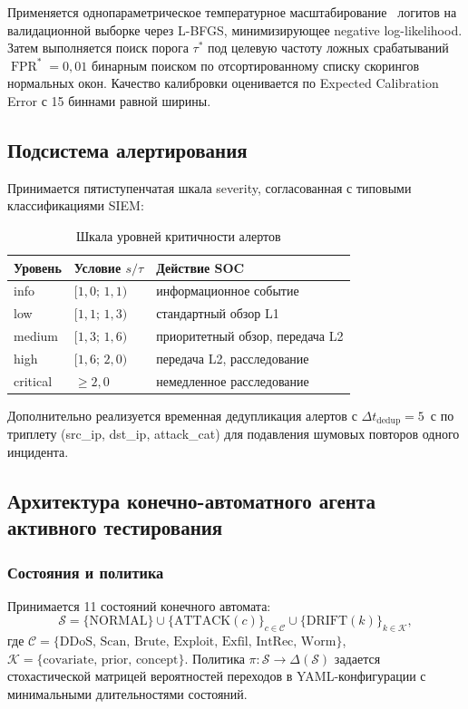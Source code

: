 Применяется однопараметрическое температурное
масштабирование~\cite{guo2017calibration} логитов на валидационной
выборке через L-BFGS, минимизирующее
negative log-likelihood. Затем выполняется поиск порога $\tau^*$
под целевую частоту ложных срабатываний $\operatorname{FPR}^* = 0{,}01$
бинарным поиском по отсортированному списку скорингов нормальных
окон. Качество калибровки оценивается по Expected Calibration Error
с 15 биннами равной ширины.

\subsection{Подсистема алертирования}

Принимается пятиступенчатая шкала severity, согласованная с
типовыми классификациями SIEM:

\begin{table}[H]
\caption{Шкала уровней критичности алертов}
\label{tab:severity-ladder}
\centering
\begin{tabularx}{\linewidth}{|L{2.0cm}|L{3.5cm}|Z|}
\hline
Уровень & Условие $s / \tau$ & Действие SOC \\
\hline
info & $[1{,}0;\, 1{,}1)$ & информационное событие \\
\hline
low & $[1{,}1;\, 1{,}3)$ & стандартный обзор L1 \\
\hline
medium & $[1{,}3;\, 1{,}6)$ & приоритетный обзор, передача L2 \\
\hline
high & $[1{,}6;\, 2{,}0)$ & передача L2, расследование \\
\hline
critical & $\geq 2{,}0$ & немедленное расследование \\
\hline
\end{tabularx}
\end{table}

Дополнительно реализуется временная дедупликация алертов с
$\Delta t_{\text{dedup}} = 5$~с по триплету (src\_ip, dst\_ip,
attack\_cat) для подавления шумовых повторов одного инцидента.

\subsection{Архитектура конечно-автоматного агента активного тестирования}

\subsubsection{Состояния и политика}

Принимается 11 состояний конечного автомата:
\[
\mathcal{S} = \{\text{NORMAL}\} \cup \{\text{ATTACK}(c)\}_{c \in \mathcal{C}}
\cup \{\text{DRIFT}(k)\}_{k \in \mathcal{K}},
\]
где $\mathcal{C} = \{\text{DDoS, Scan, Brute, Exploit, Exfil, IntRec, Worm}\}$,
$\mathcal{K} = \{\text{covariate, prior, concept}\}$. Политика
$\pi : \mathcal{S} \to \Delta(\mathcal{S})$ задается стохастической
матрицей вероятностей переходов в YAML-конфигурации с
минимальными длительностями состояний.

